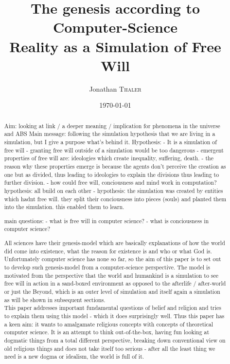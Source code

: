 \documentclass[twocolumn]{article}
\title{The genesis according to Computer-Science \\ Reality as a Simulation of Free Will} %
\author{Jonathan \textsc{Thaler}} %
\date{\today} %
\begin{document}
\maketitle %

\begin{abstract}
Aim: looking at link / a deeper meaning / implication for phenomena in the universe and ABS
Main message: following the simulation hypothesis that we are living in a simulation, but I give a purpose what's behind it. 
	Hypothesis: 
		- It is a simulation of free will 
		- granting free will outside of a simulation would be too dangerous
		- emergent properties of free will are: ideologies which create inequality, suffering, death. 
		- the reason why these properties emerge is because the agents don't perceive the creation as one but as divided, thus leading to ideologies to explain the divisions thus leading to further division.
		- how could free will, conciousness and mind work in computation? hypothesis: all build on each other
		- hypothesis: the simulation was created by entities which hadnt free will. they split their conciousness into pieces (souls) and planted them into the simulation. this enabled them to learn.

main questions: 
	- what is free will in computer science?
	- what is conciousness in computer science?

All sciences have their genesis-model which are basically explanations of how the world did come into existence, what the reason for existence is and who or what God is. Unfortunately computer science has none so far, so the aim of this paper is to set out to develop such genesis-model from a computer-science perspective. The model is motivated from the perspective that the world and humankind is a simulation to see free will in action in a sand-boxed environment as opposed to the afterlife / after-world or just the Beyond, which is an outer level of simulation and itself again a simulation as will be shown in subsequent sections. \\
This paper addresses important fundamental questions of belief and religion and tries to explain them using this model - which it does surprisingly well. Thus this paper has a keen aim: it wants to amalgamate religious concepts with concepts of theoretical computer science. It is an attempt to think out-of-the-box, having fun looking at dogmatic things from a total different perspective, breaking down conventional view on old religious things and does not take itself too serious - after all the least thing we need is a new dogma or idealism, the world is full of it.


\end{abstract}
\end{document}
